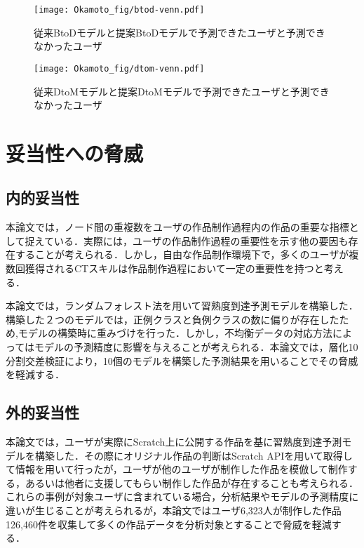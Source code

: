 \documentclass[11pt,dvipdfmx]{jreport}
\begin{document}
\begin{figure*}[t]
	\centering
	\texttt{[image: Okamoto\_fig/btod-venn.pdf]}
        \vspace{-15mm}
	\caption{従来BtoDモデルと提案BtoDモデルで予測できたユーザと予測できなかったユーザ}
	\label{fig:btod-venn}
\end{figure*}

\begin{figure*}[t]
	\centering
	\texttt{[image: Okamoto\_fig/dtom-venn.pdf]}
        \vspace{-15mm}
	\caption{従来DtoMモデルと提案DtoMモデルで予測できたユーザと予測できなかったユーザ}
	\label{fig:dtom-venn}
\end{figure*}



\chapter{妥当性への脅威}
\section{内的妥当性}

本論文では，ノード間の重複数をユーザの作品制作過程内の作品の重要な指標として捉えている．実際には，ユーザの作品制作過程の重要性を示す他の要因も存在することが考えられる．しかし，自由な作品制作環境下で，多くのユーザが複数回獲得されるCTスキルは作品制作過程において一定の重要性を持つと考える．

本論文では，ランダムフォレスト法を用いて習熟度到達予測モデルを構築した．構築した２つのモデルでは，正例クラスと負例クラスの数に偏りが存在したため,モデルの構築時に重みづけを行った．しかし，不均衡データの対応方法によってはモデルの予測精度に影響を与えることが考えられる．本論文では，層化10分割交差検証により，10個のモデルを構築した予測結果を用いることでその脅威を軽減する．

\section{外的妥当性}

本論文では，ユーザが実際にScratch上に公開する作品を基に習熟度到達予測モデルを構築した．その際にオリジナル作品の判断はScratch APIを用いて取得して情報を用いて行ったが，ユーザが他のユーザが制作した作品を模倣して制作する，あるいは他者に支援してもらい制作した作品が存在することも考えられる．これらの事例が対象ユーザに含まれている場合，分析結果やモデルの予測精度に違いが生じることが考えられるが，本論文ではユーザ6,323人が制作した作品126,460件を収集して多くの作品データを分析対象とすることで脅威を軽減する．
\end{document}
